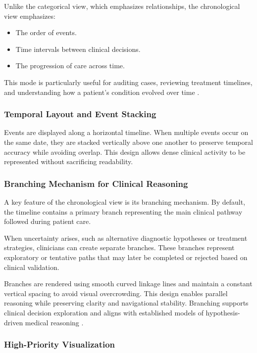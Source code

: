 \documentclass{article}
\begin{document}
Unlike the categorical view, which emphasizes relationships, the chronological
view emphasizes:
\begin{itemize}
    \item The order of events.
    \item Time intervals between clinical decisions.
    \item The progression of care across time.
\end{itemize}

This mode is particularly useful for auditing cases, reviewing treatment
timelines, and understanding how a patient’s condition evolved over time
\cite{patientSafetyDashboards2021}.

\subsubsection{Temporal Layout and Event Stacking}

Events are displayed along a horizontal timeline. When multiple events occur on
the same date, they are stacked vertically above one another to preserve
temporal accuracy while avoiding overlap. This design allows dense clinical
activity to be represented without sacrificing readability.

\subsubsection{Branching Mechanism for Clinical Reasoning}

A key feature of the chronological view is its branching mechanism. By default,
the timeline contains a primary branch representing the main clinical pathway
followed during patient care.

When uncertainty arises, such as alternative diagnostic hypotheses or treatment
strategies, clinicians can create separate branches. These branches represent
exploratory or tentative paths that may later be completed or rejected based on
clinical validation.

Branches are rendered using smooth curved linkage lines and maintain a constant
vertical spacing to avoid visual overcrowding. This design enables parallel
reasoning while preserving clarity and navigational stability. Branching
supports clinical decision exploration and aligns with established models of
hypothesis-driven medical reasoning \cite{interactiveDashboards2020}.

\subsubsection{High-Priority Visualization}
\end{document}
